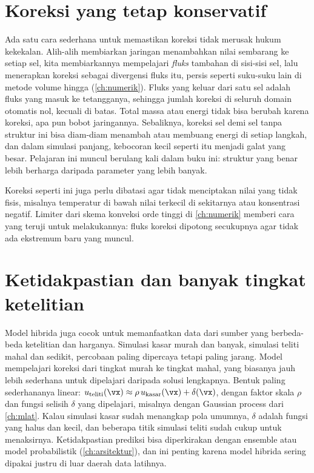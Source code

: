 \section{Koreksi yang tetap konservatif}

Ada satu cara sederhana untuk memastikan koreksi tidak merusak hukum kekekalan. Alih-alih membiarkan jaringan
menambahkan nilai sembarang ke setiap sel, kita membiarkannya mempelajari \emph{fluks} tambahan di sisi-sisi sel, lalu
menerapkan koreksi sebagai divergensi fluks itu, persis seperti suku-suku lain di metode volume hingga
(\cref{ch:numerik}). Fluks yang keluar dari satu sel adalah fluks yang masuk ke tetangganya, sehingga jumlah koreksi di
seluruh domain otomatis nol, kecuali di batas. Total massa atau energi tidak bisa berubah karena koreksi, apa pun bobot
jaringannya. Sebaliknya, koreksi sel demi sel tanpa struktur ini bisa diam-diam menambah atau membuang energi di setiap
langkah, dan dalam simulasi panjang, kebocoran kecil seperti itu menjadi galat yang besar. Pelajaran ini muncul berulang
kali dalam buku ini: struktur yang benar lebih berharga daripada parameter yang lebih banyak.

Koreksi seperti ini juga perlu dibatasi agar tidak menciptakan nilai yang tidak fisis, misalnya temperatur di bawah
nilai terkecil di sekitarnya atau konsentrasi negatif. Limiter dari skema konveksi orde tinggi di \cref{ch:numerik}
memberi cara yang teruji untuk melakukannya: fluks koreksi dipotong secukupnya agar tidak ada ekstremum baru yang
muncul.

\section{Ketidakpastian dan banyak tingkat ketelitian}

Model hibrida juga cocok untuk memanfaatkan data dari sumber yang berbeda-beda ketelitian dan harganya.
Simulasi kasar murah dan banyak, simulasi teliti mahal dan sedikit, percobaan paling dipercaya tetapi
paling jarang. Model  mempelajari koreksi dari tingkat murah ke tingkat mahal, yang
biasanya jauh lebih sederhana untuk dipelajari daripada solusi lengkapnya. Bentuk paling sederhananya linear:
$u_{\mathrm{teliti}}(\vx)\approx\rho\,u_{\mathrm{kasar}}(\vx)+\delta(\vx)$, dengan faktor skala $\rho$ dan fungsi
selisih $\delta$ yang dipelajari, misalnya dengan Gaussian process dari \cref{ch:mlat}. Kalau simulasi kasar sudah
menangkap pola umumnya, $\delta$ adalah fungsi yang halus dan kecil, dan beberapa titik simulasi teliti sudah cukup
untuk menaksirnya. Ketidakpastian prediksi bisa
diperkirakan dengan ensemble atau model probabilistik (\cref{ch:arsitektur}), dan ini penting karena model
hibrida sering dipakai justru di luar daerah data latihnya.

